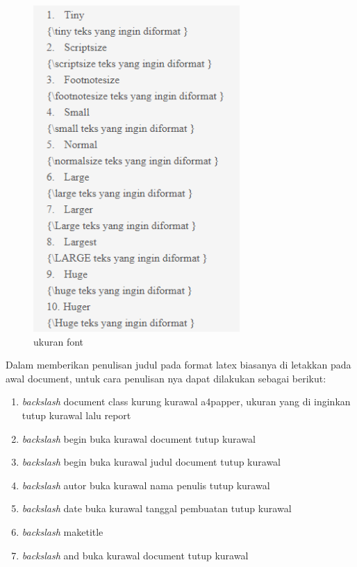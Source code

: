\begin{figure}[ht]
\centerline{\includegraphics[width=0.7\textwidth]{figures/1.PNG}}
\caption{ukuran font}
\label{labelgambar1}
\end{figure}

Dalam memberikan penulisan judul pada format latex biasanya di letakkan pada awal document, untuk cara penulisan nya dapat dilakukan sebagai berikut:
\begin{enumerate}
  \item \textit{backslash} document class kurung kurawal a4papper, ukuran yang di inginkan tutup kurawal lalu report
  \item \textit{backslash} begin buka kurawal document tutup kurawal
  \item \textit{backslash} begin buka kurawal judul document tutup kurawal
  \item \textit{backslash} autor buka kurawal nama penulis tutup kurawal
  \item \textit{backslash} date buka kurawal tanggal pembuatan tutup kurawal
  \item \textit{backslash} maketitle
  \item \textit{backslash} and buka kurawal document tutup kurawal
\end{enumerate}

